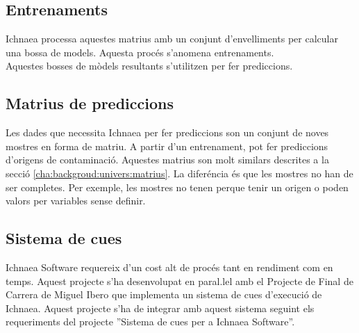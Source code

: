 \subsection{Entrenaments}
Ichnaea processa aquestes matrius amb un conjunt d'envelliments per calcular una bossa de models. Aquesta proc\'{e}s s'anomena entrenaments. \\
Aquestes bosses de m\`{o}dels resultants s'utilitzen per fer prediccions.

\subsection{Matrius de prediccions}
Les dades que necessita Ichnaea per fer prediccions son un conjunt de noves mostres en forma de matriu. A partir d'un entrenament, pot fer prediccions d'origens de contaminaci\'{o}. Aquestes matrius son molt similars descrites a la secci\'{o} \ref{cha:backgroud:univers:matrius}. La difer\'{e}ncia \'{e}s que les mostres no han de ser completes. Per exemple, les mostres no tenen perque tenir un origen o poden valors per variables sense definir.

\subsection{Sistema de cues}
Ichnaea Software requereix d'un cost alt de proc\'{e}s tant en rendiment com en temps. Aquest projecte s'ha desenvolupat en paral.lel amb el Projecte de Final de Carrera de Miguel Ibero que implementa un sistema de cues d'execuci\'{o} de Ichnaea. Aquest projecte s'ha de integrar amb aquest sistema seguint els requeriments del projecte ''Sistema de cues per a Ichnaea Software''.
